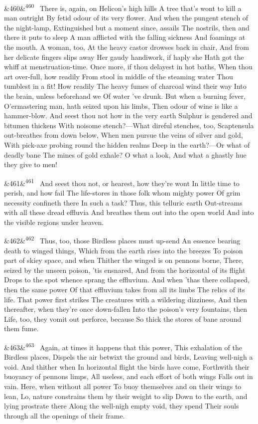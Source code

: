 \documentclass[12pt]{article}
\newcommand{\para}[1][]{\par\noindent\ifx&#1&\else\textsuperscript{\footnotesize #1}~\fi}
\begin{document}
\para[460] There is, again, on Helicon's high hills A tree that's wont to kill a man outright By fetid odour of its very flower. And when the pungent stench of the night-lamp, Extinguished but a moment since, assails The nostrils, then and there it puts to sleep A man afflicted with the falling sickness And foamings at the mouth. A woman, too, At the heavy castor drowses back in chair, And from her delicate fingers slips away Her gaudy handiwork, if haply she Hath got the whiff at menstruation-time. Once more, if thou delayest in hot baths, When thou art over-full, how readily From stool in middle of the steaming water Thou tumblest in a fit! How readily The heavy fumes of charcoal wind their way Into the brain, unless beforehand we Of water 've drunk. But when a burning fever, O'ermastering man, hath seized upon his limbs, Then odour of wine is like a hammer-blow. And seest thou not how in the very earth Sulphur is gendered and bitumen thickens With noisome stench?---What direful stenches, too, Scaptensula out-breathes from down below, When men pursue the veins of silver and gold, With pick-axe probing round the hidden realms Deep in the earth?---Or what of deadly bane The mines of gold exhale? O what a look, And what a ghastly hue they give to men!

\para[461] And seest thou not, or hearest, how they're wont In little time to perish, and how fail The life-stores in those folk whom mighty power Of grim necessity confineth there In such a task? Thus, this telluric earth Out-streams with all these dread effluvia And breathes them out into the open world And into the visible regions under heaven.

\para[462] Thus, too, those Birdless places must up-send An essence bearing death to winged things, Which from the earth rises into the breezes To poison part of skiey space, and when Thither the winged is on pennons borne, There, seized by the unseen poison, 'tis ensnared, And from the horizontal of its flight Drops to the spot whence sprang the effluvium. And when 'thas there collapsed, then the same power Of that effluvium takes from all its limbs The relics of its life. That power first strikes The creatures with a wildering dizziness, And then thereafter, when they're once down-fallen Into the poison's very fountains, then Life, too, they vomit out perforce, because So thick the stores of bane around them fume.

\para[463] Again, at times it happens that this power, This exhalation of the Birdless places, Dispels the air betwixt the ground and birds, Leaving well-nigh a void. And thither when In horizontal flight the birds have come, Forthwith their buoyancy of pennons limps, All useless, and each effort of both wings Falls out in vain. Here, when without all power To buoy themselves and on their wings to lean, Lo, nature constrains them by their weight to slip Down to the earth, and lying prostrate there Along the well-nigh empty void, they spend Their souls through all the openings of their frame.
\end{document}
